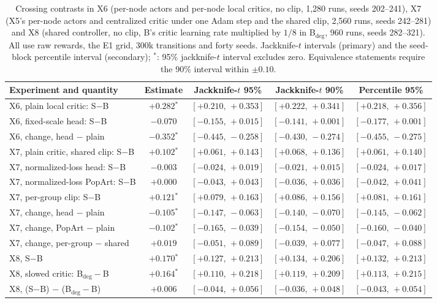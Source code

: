 \begin{table}[!htbp]
\caption{Crossing contrasts in X6 (per-node actors and per-node local critics, no clip, 1,280 runs, seeds 202--241), X7 (X5's per-node actors and centralized critic under one Adam step and the shared clip, 2,560 runs, seeds 242--281) and X8 (shared controller, no clip, B's critic learning rate multiplied by $1/8$ in B$_{\mathrm{deg}}$, 960 runs, seeds 282--321). All use raw rewards, the E1 grid, 300k transitions and forty seeds. Jackknife-$t$ intervals (primary) and the seed-block percentile interval (secondary); $^{\ast}$: 95\% jackknife-$t$ interval excludes zero. Equivalence statements require the 90\% interval within $\pm0.10$.}
\label{tab:x678}
\centering\footnotesize
\begin{tabular}{@{}>{\raggedright\arraybackslash}p{}cccc@{}}
\toprule
Experiment and quantity & Estimate & Jackknife-$t$ 95\% & Jackknife-$t$ 90\% & Percentile 95\% \\
\midrule
X6, plain local critic: S$-$B & $+0.282$$^{\ast}$ & $[+0.210,\,+0.353]$ & $[+0.222,\,+0.341]$ & $[+0.218,\,+0.356]$ \\
X6, fixed-scale head: S$-$B & $-0.070$ & $[-0.155,\,+0.015]$ & $[-0.141,\,+0.001]$ & $[-0.177,\,+0.001]$ \\
X6, change, head $-$ plain & $-0.352$$^{\ast}$ & $[-0.445,\,-0.258]$ & $[-0.430,\,-0.274]$ & $[-0.455,\,-0.275]$ \\
X7, plain critic, shared clip: S$-$B & $+0.102$$^{\ast}$ & $[+0.061,\,+0.143]$ & $[+0.068,\,+0.136]$ & $[+0.061,\,+0.140]$ \\
X7, normalized-loss head: S$-$B & $-0.003$ & $[-0.024,\,+0.019]$ & $[-0.021,\,+0.015]$ & $[-0.024,\,+0.017]$ \\
X7, normalized-loss PopArt: S$-$B & $+0.000$ & $[-0.043,\,+0.043]$ & $[-0.036,\,+0.036]$ & $[-0.042,\,+0.041]$ \\
X7, per-group clip: S$-$B & $+0.121$$^{\ast}$ & $[+0.079,\,+0.163]$ & $[+0.086,\,+0.156]$ & $[+0.081,\,+0.161]$ \\
X7, change, head $-$ plain & $-0.105$$^{\ast}$ & $[-0.147,\,-0.063]$ & $[-0.140,\,-0.070]$ & $[-0.145,\,-0.062]$ \\
X7, change, PopArt $-$ plain & $-0.102$$^{\ast}$ & $[-0.165,\,-0.039]$ & $[-0.154,\,-0.050]$ & $[-0.160,\,-0.040]$ \\
X7, change, per-group $-$ shared & $+0.019$ & $[-0.051,\,+0.089]$ & $[-0.039,\,+0.077]$ & $[-0.047,\,+0.088]$ \\
X8, S$-$B & $+0.170$$^{\ast}$ & $[+0.127,\,+0.213]$ & $[+0.134,\,+0.206]$ & $[+0.132,\,+0.213]$ \\
X8, slowed critic: B$_{\mathrm{deg}}-$B & $+0.164$$^{\ast}$ & $[+0.110,\,+0.218]$ & $[+0.119,\,+0.209]$ & $[+0.113,\,+0.215]$ \\
X8, (S$-$B) $-$ (B$_{\mathrm{deg}}-$B) & $+0.006$ & $[-0.044,\,+0.056]$ & $[-0.036,\,+0.048]$ & $[-0.043,\,+0.054]$ \\
\bottomrule
\end{tabular}
\end{table}
